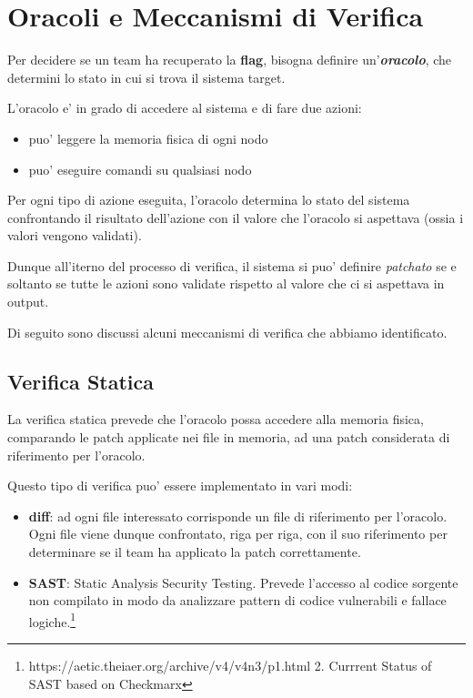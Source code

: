 \section{Oracoli e Meccanismi di
Verifica}\label{oracoli-e-meccanismi-di-verifica}

Per decidere se un team ha recuperato la \textbf{flag}, bisogna definire
un'\textbf{\emph{oracolo}}, che determini lo stato in cui si trova il
sistema target.

L'oracolo e' in grado di accedere al sistema e di fare due azioni:

\begin{itemize}
\tightlist
\item
  puo' leggere la memoria fisica di ogni nodo
\item
  puo' eseguire comandi su qualsiasi nodo
\end{itemize}

Per ogni tipo di azione eseguita, l'oracolo determina lo stato del
sistema confrontando il risultato dell'azione con il valore che
l'oracolo si aspettava (ossia i valori vengono validati).

Dunque all'iterno del processo di verifica, il sistema si puo' definire
\emph{patchato} se e soltanto se tutte le azioni sono validate rispetto
al valore che ci si aspettava in output.

Di seguito sono discussi alcuni meccanismi di verifica che abbiamo
identificato.

\subsection{Verifica Statica}\label{verifica-statica}

La verifica statica prevede che l'oracolo possa accedere alla memoria
fisica, comparando le patch applicate nei file in memoria, ad una patch
considerata di riferimento per l'oracolo.

Questo tipo di verifica puo' essere implementato in vari modi:

\begin{itemize}
\tightlist
\item
  \textbf{diff}: ad ogni file interessato corrisponde un file di
  riferimento per l'oracolo. Ogni file viene dunque confrontato, riga
  per riga, con il suo riferimento per determinare se il team ha
  applicato la patch correttamente.
\item
  \textbf{SAST}: Static Analysis Security Testing. Prevede l'accesso al
  codice sorgente non compilato in modo da analizzare pattern di codice
  vulnerabili e fallace logiche.\footnote{\label{fn:ref_12}https://aetic.theiaer.org/archive/v4/v4n3/p1.html
    2. Currrent Status of SAST based on Checkmarx}
\end{itemize}

